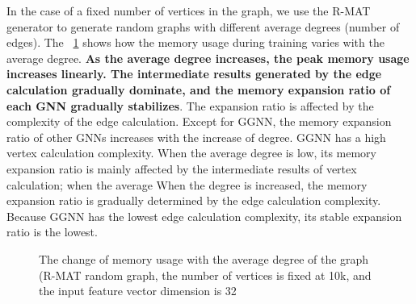 In the case of a fixed number of vertices in the graph, we use the R-MAT generator to generate random graphs with different average degrees (number of edges).
The \figurename~\ref{fig:exp_memory_expansion_ratio_input_graph_number_of_edges} shows how the memory usage during training varies with the average degree.
\textbf{As the average degree increases, the peak memory usage increases linearly.
    The intermediate results generated by the edge calculation gradually dominate, and the memory expansion ratio of each GNN gradually stabilizes}.
The expansion ratio is affected by the complexity of the edge calculation.
Except for GGNN, the memory expansion ratio of other GNNs increases with the increase of degree. GGNN has a high vertex calculation complexity.
When the average degree is low, its memory expansion ratio is mainly affected by the intermediate results of vertex calculation;
when the average When the degree is increased, the memory expansion ratio is gradually determined by the edge calculation complexity.
Because GGNN has the lowest edge calculation complexity, its stable expansion ratio is the lowest.

\begin{figure}
    \centering
    \caption{The change of memory usage with the average degree of the graph (R-MAT random graph, the number of vertices is fixed at 10k, and the input feature vector dimension is 32}
    \label{fig:exp_memory_expansion_ratio_input_graph_number_of_edges}
\end{figure}

